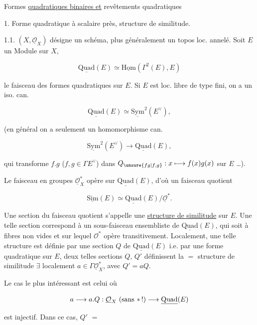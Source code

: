 
Formes \uline{quadratiques binaires et} revêtements quadratiques

1. Forme quadratique à scalaire près, structure de similitude.

1.1. $(X,\underline{\mathcal O}_X)$ désigne un schéma, plus généralement un topos loc. annelé. Soit $E$ un Module sur $X$,

\[\underline{\mathrm{Quad}}(E)\simeq\underline{\mathrm{Hom}}(\Gamma^2(E),E)\]

le faisceau des formes quadratiques sur $E$. Si $E$ est loc. libre de type fini, on a un iso. can.

\[\underline{\mathrm{Quad}}(E)\simeq\underline{\mathrm{Sym}}^2(E^\vee),\]

(en général on a seulement un homomorphisme can.

\[\underline{\mathrm{Sym}}^2(E^\vee)\longrightarrow\underline{\mathrm{Quad}}(E),\]

qui transforme $f.g$ ($f,g\in\Gamma E^\vee$) dans $Q_{\unsure{fg|f,g}}:x\longmapsto f(x)g(x)$ sur $E$ \ldots).

Le faisceau  en groupes $\underline{\mathcal O}_X^\ast$ opère sur $\underline{\mathrm{Quad}}(E)$, d'où un faisceau quotient

\[\underline{\mathrm{Sim}}(E)\simeq\underline{\mathrm{Quad}}(E)/\underline{\mathcal O}^{\ast}.\]

Une section du faisceau quotient s'appelle une \uline{structure de similitude} sur $E$. Une telle section correspond à un sous-faisceau ensembliste de $\underline{\mathrm{Quad}}(E)$, qui  soit à fibres non vides et sur lequel $\mathcal O^\ast$ opère transitivement. Localement, une telle structure est définie par une section $Q$ de $\underline{\mathrm{Quad}}(E)$ i.e. par une forme quadratique sur $E$,  deux telles sections $Q$, $Q'$ définissent la $=$ structure de similitude  $\exists$ localement $a\in\Gamma\underline{\mathcal O}_X^\ast$, avec $Q'=aQ$.

Le cas le plus intéressant est celui où 

\[a\longrightarrow a.Q:\underline{\mathcal O}_X\ (\text{sans $\ast$\,!})\longrightarrow\underline{\mathrm{Quad}}(E)\]

est injectif. Dans ce cas,  $Q'$   $=$
